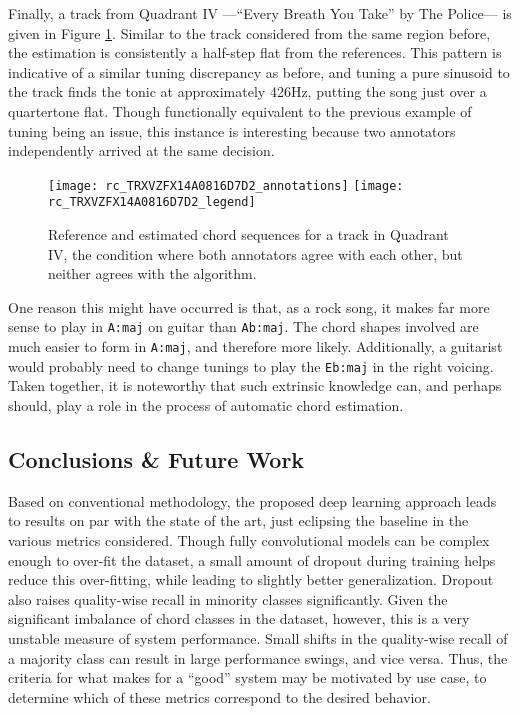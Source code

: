 Finally, a track from Quadrant IV ---``Every Breath You Take'' by The Police--- is given in Figure \ref{fig:rc_quadIV}.
Similar to the track considered from the same region before, the estimation is consistently a half-step flat from the references.
This pattern is indicative of a similar tuning discrepancy as before, and tuning a pure sinusoid to the track finds the tonic at approximately 426Hz, putting the song just over a quartertone flat.
Though functionally equivalent to the previous example of tuning being an issue, this instance is interesting because two annotators independently arrived at the same decision.
\begin{figure}[t!]
\centering
\texttt{[image: rc\_TRXVZFX14A0816D7D2\_annotations]}
\texttt{[image: rc\_TRXVZFX14A0816D7D2\_legend]}
\caption{Reference and estimated chord sequences for a track in Quadrant IV, the condition where both annotators agree with each other, but neither agrees with the algorithm.}
\label{fig:rc_quadIV}
\end{figure}
One reason this might have occurred is that, as a rock song, it makes far more sense to play in \texttt{A:maj} on guitar than \texttt{Ab:maj}.
The chord shapes involved are much easier to form in \texttt{A:maj}, and therefore more likely.
Additionally, a guitarist would probably need to change tunings to play the \texttt{Eb:maj} in the right voicing.
Taken together, it is noteworthy that such extrinsic knowledge can, and perhaps should, play a role in the process of automatic chord estimation.



\subsection{Conclusions \& Future Work}
\label{subsec:conclusions}

Based on conventional methodology, the proposed deep learning approach leads to results on par with the state of the art, just eclipsing the baseline in the various metrics considered.
Though fully convolutional models can be complex enough to over-fit the dataset, a small amount of dropout during training helps reduce this over-fitting, while leading to slightly better generalization.
Dropout also raises quality-wise recall in minority classes significantly.
Given the significant imbalance of chord classes in the dataset, however, this is a very unstable measure of system performance.
Small shifts in the quality-wise recall of a majority class can result in large performance swings, and vice versa.
Thus, the criteria for what makes for a ``good'' system may be motivated by use case, to determine which of these metrics correspond to the desired behavior.

